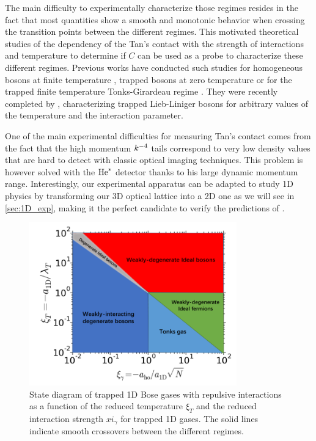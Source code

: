 The main difficulty to experimentally characterize those regimes resides in the fact that most quantities show a smooth and monotonic behavior when crossing the transition points between the different regimes. This motivated theoretical studies of the dependency of the Tan's contact with the strength of interactions and temperature to determine if $C$ can be used as a probe to characterize these different regimes. Previous works have conducted such studies for homogeneous bosons at finite temperature \cite{kheruntsyan2003pair,kormos2009expectation}, trapped bosons at zero temperature \cite{minguzzi2002high,olshanii2003short} or for the trapped finite temperature Tonks-Girardeau regime \cite{vignolo2013universal}. They were recently completed by \cite{yao2018tan}, characterizing trapped Lieb-Liniger bosons for arbitrary values of the temperature and the interaction parameter.

One of the main experimental difficulties for measuring Tan's contact comes from the fact that the high momentum $k^{-4}$ tails correspond to very low density values that are hard to detect with classic optical imaging techniques. This problem is however solved with the $\mathrm{He}^*$ detector thanks to his large dynamic momentum range. Interestingly, our experimental apparatus can be adapted to study 1D physics by transforming our 3D optical lattice into a 2D one as we will see in \ref{sec:1D_exp}, making it the perfect candidate to verify the predictions of \cite{yao2018tan}.

\begin{figure}
    \centering
    \includegraphics[width=0.8\textwidth]{Fig/Chapter5/state_diagam_hepeng.png}
    \caption[State diagram of trapped 1D Bose gases with repulsive interactions as a function of the reduced temperature $\xi_T$ and the reduced interaction strength $xi_{\gamma}$ for trapped 1D gases]{State diagram of trapped 1D Bose gases with repulsive interactions as a function of the reduced temperature $\xi_T$ and the reduced interaction strength $xi_{\gamma}$ for trapped 1D gases. The solid lines indicate smooth crossovers between the different regimes.}
    \label{fig:1D_diagram}
\end{figure}


